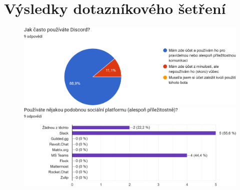 \documentclass[FM]{tulthesis}
\begin{document}
	\chapter{Výsledky dotazníkového šetření}\label{AppendixQuestionnaire}
	\begin{figure}[ht]
		\centering
		\includegraphics[width=\textwidth]{img/questionnaire/1}\bigskip\par
		\includegraphics[width=\textwidth]{img/questionnaire/2}\bigskip\par
	\end{figure}
\end{document}
